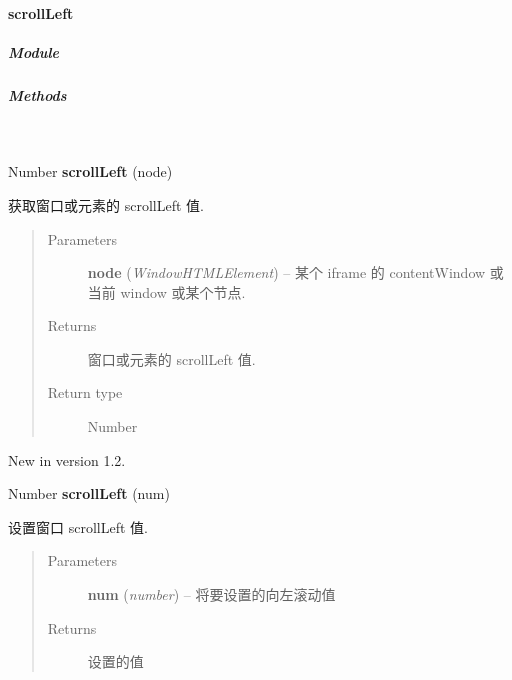 \documentclass[letterpaper,10pt,english]{sphinxmanual}
\begin{document}
\paragraph{scrollLeft}
\label{api/core/dom/scrollLeft::doc}\label{api/core/dom/scrollLeft:scrollleft}

\subparagraph{Module}
\label{api/core/dom/scrollLeft:module}\begin{quote}

{\hyperref[api/core/dom/index:module-DOM]{}}
\end{quote}


\subparagraph{Methods}
\label{api/core/dom/scrollLeft:methods}

\begin{fulllineitems}
\label{api/core/dom/scrollLeft:DOM.scrollLeft}~
\begin{DUlineblock}{0em}
\item[] Number \textbf{scrollLeft} (node)
\item[] 获取窗口或元素的 scrollLeft 值.
\end{DUlineblock}
\begin{quote}\begin{description}
\item[{Parameters}] \leavevmode
\textbf{node} (\emph{Window\textbar{}HTMLElement}) -- 某个 iframe 的 contentWindow 或当前 window 或某个节点.

\item[{Returns}] \leavevmode
窗口或元素的 scrollLeft 值.

\item[{Return type}] \leavevmode
Number

\end{description}\end{quote}
New in version 1.2.
\begin{DUlineblock}{0em}
\item[] Number \textbf{scrollLeft} (num)
\item[] 设置窗口 scrollLeft 值.
\end{DUlineblock}
\begin{quote}\begin{description}
\item[{Parameters}] \leavevmode
\textbf{num} (\emph{number}) -- 将要设置的向左滚动值

\item[{Returns}] \leavevmode
设置的值


\end{description}
\end{quote}
\end{fulllineitems}
\end{document}

